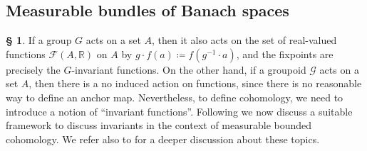 \documentclass[11pt, oneside]{amsart}
\theoremstyle{definition}
\newtheorem{no}[lemma]{\S}
\theoremstyle{remark}
\theoremstyle{TheoremNum}
\newcommand\cF{{\mathcal F}}
\newcommand{\cG}{\mathcal{G}}
\newcommand{\bR}{\mathbb{R}}
\begin{document}
\subsection{Measurable bundles of Banach spaces}\label{sec2.4}

\begin{no} If a group $G$ acts on a set $A$, then it also acts on the set of real-valued functions $\cF(A, \bR)$ on $A$ by $g \cdot f(a) \coloneqq f(g^{-1} \cdot a)$, and the fixpoints are precisely the $G$-invariant functions. On the other hand, if a groupoid $\cG$ acts on a set $A$, then there is a no induced action on functions, since there is no reasonable way to define an anchor map. Nevertheless, to define cohomology, we need to introduce a notion of ``invariant functions''. 
Following \cite{sarti:savini25} we now discuss a suitable framework to discuss invariants in the context of measurable bounded cohomology. We refer also to \cite{fell:doran} for a deeper discussion about these topics.
\end{no}
\end{document}
